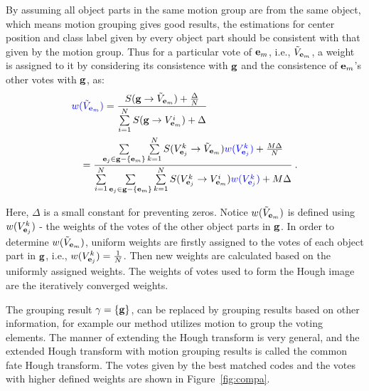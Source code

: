  By assuming all object parts in the same motion group are from the same object, which means motion grouping gives good results, the estimations for center position and class label given by every object part should be consistent with that given by the motion group.
Thus for a particular vote of ${\bf{e}}_m$, i.e., ${\tilde{V}}_{{\bf{e}}_m}$, a weight is assigned to it by considering its consistence with $\bf{g}$ and the consistence of ${\bf{e}}_m$'s other votes  with $\bf{g}$, as:
\begin{equation}
\begin{aligned}
{\color{blue}w(}&{\color{blue}{\tilde{V}}_{{\bf{e}}_m})}
= \frac
{S({\bf{g}} \to {{\tilde{V}}_{{\bf{e}}_m}}) + \frac{\Delta } N}
{\sum\limits^N_{i=1}{ S({\bf{g}} \to {V^i_{{{\bf{e}}_m}}})} + \Delta }\\
&
\begin{aligned}
= \frac
{ \sum\limits_{{{\bf{e}}_j} \in {\bf{g}}- \{ {{\bf{e}}_m} \}} {
\sum\limits^N_{k=1} {S({{V^k_{{{\bf{e}}_j}}} \to {{\tilde{V}}_{{{\bf{e}}_m}}}})\color{blue}{w(V^k_{{\bf{e}}_j})}}
}  + \frac{M\Delta } N}
{\sum\limits^N_{i=1}{
\sum\limits_{{{\bf{e}}_j} \in {\bf{g}}- \{ {{\bf{e}}_m} \}} {
\sum\limits^N_{k=1} {S({{V^k_{{{\bf{e}}_j}}} \to {V^i_{{{\bf{e}}_m}}}})\color{blue}{w(V^k_{{\bf{e}}_j})}}
}
} + M\Delta }\:.
\end{aligned}
\end{aligned}
\label{eq4}
\end{equation}

Here, $\Delta$ is a small constant for preventing zeros. Notice $w({\tilde{V}}_{{\bf{e}}_m})$ is defined using $w(V^k_{{\bf{e}}_j})$ - the weights of the votes of the other object parts in ${\bf{g}}$. In order to determine $w({\tilde{V}}_{{\bf{e}}_m})$, uniform weights are firstly assigned to the votes of each object part in ${\bf{g}}$, i.e., $w(V^k_{{\bf{e}}_j})=\frac{1}{N}$. Then new weights are calculated based on the uniformly assigned weights. The weights of votes used to form the Hough image are the iteratively converged weights.

The grouping result $\gamma=\{\bf{g}\}$, can be replaced by grouping results based on other information, for example our method utilizes motion to group the voting elements. The manner of extending the Hough transform is very general, and the extended Hough transform with motion grouping results is called the common fate Hough transform. The votes given by the best matched codes and the votes with higher defined weights are shown in Figure~\ref{fig:compa}.

